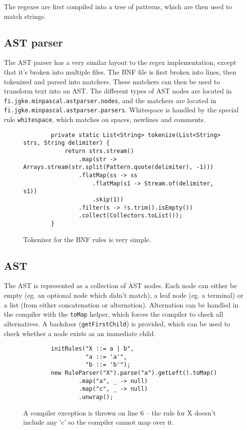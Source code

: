\documentclass{article}
\begin{document}
The regexes are first compiled into a tree of patterns, which are then used to
match strings.

\subsection{AST parser}
The AST parser has a very similar layout to the regex implementation, except
that it's broken into multiple files. The BNF file is first broken into lines,
then tokenized and parsed into matchers. These matchers can then be used to
transform text into an AST. The different types of AST nodes are located in
\texttt{fi.jgke.minpascal.astparser.nodes}, and the matchers are located in
\texttt{fi.jgke.minpascal.astparser.parsers}. Whitespace is handled by the
special rule \texttt{whitespace}, which matches on spaces, newlines and
comments.

\FloatBarrier

\noindent
\begin{figure}[ht!]
    \begin{verbatim}
        private static List<String> tokenize(List<String> strs, String delimiter) {
            return strs.stream()
                .map(str -> Arrays.stream(str.split(Pattern.quote(delimiter), -1)))
                .flatMap(ss -> ss
                    .flatMap(s1 -> Stream.of(delimiter, s1))
                    .skip(1))
                .filter(s -> !s.trim().isEmpty())
                .collect(Collectors.toList());
        }
    \end{verbatim}
    \caption{Tokenizer for the BNF rules is very simple.}
\end{figure}

\FloatBarrier

\subsection{AST}
The AST is represented as a collection of AST nodes. Each node can either be
empty (eg. an optional node which didn't match), a leaf node (eg. a terminal)
or a list (from either concatenation or alternation). Alternation can be handled
in the compiler with the \texttt{toMap} helper, which forces the compiler to
check all alternatives. A backdoor (\texttt{getFirstChild}) is provided, which
can be used to check whether a node exists as an immediate child.

\begin{figure}[ht!]
    \begin{verbatim}
        initRules("X ::= a | b",
                  "a ::= 'a'",
                  "b ::= 'b'");
        new RuleParser("X").parse("a").getLeft().toMap()
                .map("a", _ -> null)
                .map("c", _ -> null)
                .unwrap();
    \end{verbatim}
    \caption{A compiler exception is thrown on line 6 -- the rule for X doesn't
    include any 'c' so the compiler cannot map over it.}
\end{figure}
\end{document}
